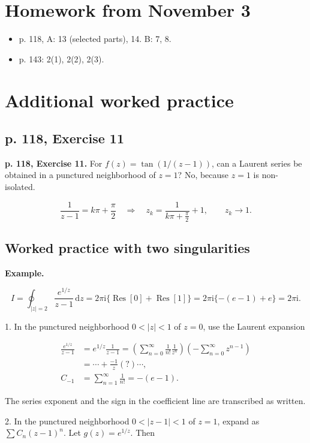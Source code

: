 \documentclass[11pt,a4paper]{article}
\theoremstyle{definition}
\theoremstyle{plain}
\begin{document}
\section{Homework from November 3}

\begin{itemize}
\item p. 118, A: 13 (selected parts), 14. B: 7, 8.
\item p. 143: 2(1), 2(2), 2(3).

\end{itemize}
\section{Additional worked practice}

\subsection{p. 118, Exercise 11}

\textbf{p. 118, Exercise 11.} For $f(z)=\tan(1/(z-1))$, can a Laurent series be obtained in a punctured neighborhood of $z=1$? No, because $z=1$ is non-isolated.

\[
\frac1{z-1}=k\pi+\frac\pi2
\quad\Rightarrow\quad z_k=\frac1{k\pi+\frac\pi2}+1,
\qquad z_k\to1.
\]


\subsection{Worked practice with two singularities}

\textbf{Example.}

\[
I=\oint_{|z|=2}\frac{e^{1/z}}{z-1}\,\mathrm{d}z
=2\pi \mathrm{i}\{\operatorname{Res}[0]+\operatorname{Res}[1]\}
=2\pi \mathrm{i}\{-(e-1)+e\}=2\pi \mathrm{i}.
\]

1. In the punctured neighborhood $0<|z|<1$ of $z=0$, use the Laurent expansion

\[
\begin{aligned}
\frac{e^{1/z}}{z-1}&=e^{1/z}\frac1{z-1}
=\left(\sum_{n=0}^{\infty}\frac1{n!}\frac1{z^n}\right)
\left(-\sum_{n=0}^{\infty}z^{n-1}\right)\\
&=\cdots+\frac{-1}{z}(?)\cdots,\\
C_{-1}&=\sum_{n=1}^{\infty}\frac1{n!}=-(e-1).
\end{aligned}
\]

The series exponent and the sign in the coefficient line are transcribed as written.

2. In the punctured neighborhood $0<|z-1|<1$ of $z=1$, expand as $\sum C_n(z-1)^n$. Let $g(z)=e^{1/z}$. Then
\end{document}
